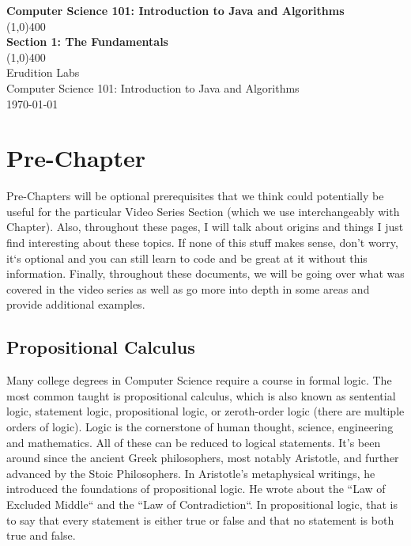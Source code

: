\documentclass[11]{article}
\begin{document}
\begin{titlepage}
\begin{center}
\vspace{1cm}
\Large{\textbf{Computer Science 101: Introduction to Java and Algorithms}}\\
\vfill
\line(1,0){400}\\
\huge{\textbf{Section 1: The Fundamentals}}\\
\line(1,0){400}\\
\vfill
Erudition Labs\\
Computer Science 101: Introduction to Java and Algorithms\\
\today\\
\end{center}
\end{titlepage}

\tableofcontents
\thispagestyle{empty}
\clearpage
\setcounter{page}{1}

\section{Pre-Chapter}
Pre-Chapters will be optional prerequisites that we think could potentially be useful for the particular Video Series Section (which we use interchangeably with Chapter). Also, throughout these pages, I will talk about origins and things I just find interesting about these topics. If none of this stuff makes sense, don't worry, it`s optional and you can still learn to code and be great at it without this information. Finally, throughout these documents, we will be going over what was covered in the video series as well as go more into depth in some areas and provide additional examples.

\subsection{Propositional Calculus}
Many college degrees in Computer Science require a course in formal logic. The most common taught is propositional calculus, which is also known as sentential logic, statement logic, propositional logic,  or zeroth-order logic (there are multiple orders of logic). Logic is the cornerstone of human thought, science, engineering and mathematics. All of these can be reduced to logical statements. It's been around since the ancient Greek philosophers, most notably Aristotle, and further advanced by the Stoic Philosophers. In Aristotle's metaphysical writings, he introduced the foundations of propositional logic. He wrote about the ``Law of Excluded Middle`` and the ``Law of Contradiction``. In propositional logic, that is to say that every statement is either true or false and that no statement is both true and false.\\
\end{document}
